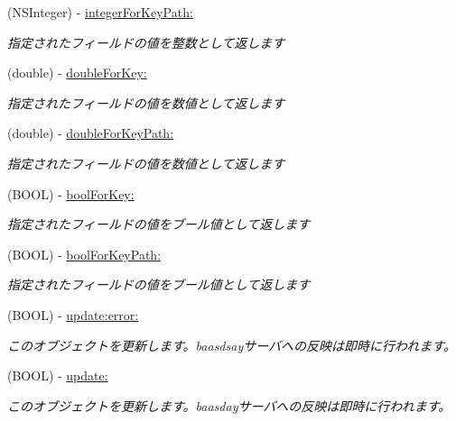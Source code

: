 \begin{DoxyCompactItemize}
(N\-S\-Integer) -\/ \hyperlink{interface_b_d_object_ab92fb4babf0f5133e5c8ad5af64aa383}{integer\-For\-Key\-Path\-:}
\begin{DoxyCompactList}\small\item\em 指定されたフィールドの値を整数として返します \end{DoxyCompactList}\item 
(double) -\/ \hyperlink{interface_b_d_object_ac42575e8402e8961cb06a2f53fd5e152}{double\-For\-Key\-:}
\begin{DoxyCompactList}\small\item\em 指定されたフィールドの値を数値として返します \end{DoxyCompactList}\item 
(double) -\/ \hyperlink{interface_b_d_object_a9ac69f0af2f96da9cd40a65cc3dc71e0}{double\-For\-Key\-Path\-:}
\begin{DoxyCompactList}\small\item\em 指定されたフィールドの値を数値として返します \end{DoxyCompactList}\item 
(B\-O\-O\-L) -\/ \hyperlink{interface_b_d_object_a6a5057f2d5915ee166f2e7c69f04bb8b}{bool\-For\-Key\-:}
\begin{DoxyCompactList}\small\item\em 指定されたフィールドの値をブール値として返します \end{DoxyCompactList}\item 
(B\-O\-O\-L) -\/ \hyperlink{interface_b_d_object_aaf550b50af258479c98f73b6db2c7e3a}{bool\-For\-Key\-Path\-:}
\begin{DoxyCompactList}\small\item\em 指定されたフィールドの値をブール値として返します \end{DoxyCompactList}\item 
(B\-O\-O\-L) -\/ \hyperlink{interface_b_d_object_ab80f1486814b7c8298963a2206b75730}{update\-:error\-:}
\begin{DoxyCompactList}\small\item\em このオブジェクトを更新します。baasdsayサーバへの反映は即時に行われます。 \end{DoxyCompactList}\item 
(B\-O\-O\-L) -\/ \hyperlink{interface_b_d_object_acb8238e46c15d731d1a21985d865ac44}{update\-:}
\begin{DoxyCompactList}\small\item\em このオブジェクトを更新します。baasdayサーバへの反映は即時に行われます。 \end{DoxyCompactList}\item 

\end{DoxyCompactItemize}
